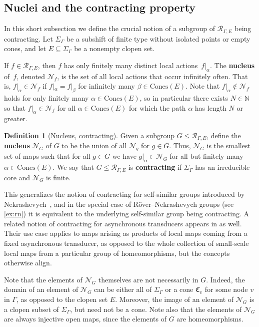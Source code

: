 \documentclass[11pt,letterpaper]{amsart}
\theoremstyle{definition}
\newtheorem{definition}[theorem]{Definition}
\newcommand{\newword}[1]{\textbf{#1}}
\newcommand{\N}{\mathbb{N}}
\newcommand{\R}{\mathcal{R}}
\newcommand{\Nuc}{\mathcal{N}}
\newcommand{\C}{\mathfrak{C}}
\newcommand{\Cones}{\mathrm{Cones}}
\begin{document}
\subsection{Nuclei and the contracting property}\label{ssec:nuclei}

In this short subsection we define the crucial notion of a subgroup of $\R_{\Gamma,E}$ being contracting. Let $\Sigma_\Gamma$ be a subshift of finite type without isolated points or empty cones, and let $E\subseteq \Sigma_\Gamma$ be a nonempty clopen set.

If $f\in \R_{\Gamma,E}$, then $f$ has only finitely many distinct local actions~$f|_\alpha$.  The \newword{nucleus} of~$f$, denoted $\Nuc_f$, is the set of all local actions that occur infinitely often. That is, $f|_{\alpha}\in \Nuc_f$ if $f|_{\alpha}=f|_{\beta}$ for infinitely many $\beta\in\Cones(E)$. 
 Note that $f|_\alpha\notin \Nuc_f$ holds for only finitely many $\alpha\in\Cones(E)$, so in particular there exists $N\in\N$ so that $f|_\alpha\in \Nuc_f$ for all $\alpha\in \Cones(E)$ for which the path $\alpha$ has length $N$ or greater.

\begin{definition}[Nucleus, contracting]\label{def:contracting}
Given a subgroup $G\le \R_{\Gamma,E}$, define the \newword{nucleus} $\Nuc_G$ of $G$ to be the union of all $\Nuc_g$ for $g\in G$. Thus, $\Nuc_G$ is the smallest set of maps such that for all $g\in G$ we have $g|_\alpha\in\Nuc_G$ for all but finitely many $\alpha\in \Cones(E)$. We say that $G\le \R_{\Gamma,E}$ is \newword{contracting} if $\Sigma_\Gamma$ has an irreducible core and $\Nuc_G$ is finite.
\end{definition}

This generalizes the notion of contracting for self-similar groups introduced by Nekrashevych~\cite{Nekrashevych-book}, and in the special case of R\"over--Nekrashevych groups (see \cref{ex:rn}) it is equivalent to the underlying self-similar group being contracting.  A related notion of contracting for asynchronous transducers appears in \cite{DonovenOlukoya} as well.  Their use case applies to maps arising as products of local maps coming from a fixed asynchronous transducer, as opposed to the whole collection of small-scale local maps from a particular group of homeomorphisms, but the concepts otherwise align.

Note that the elements of $\Nuc_G$ themselves are not necessarily in $G$. Indeed, the domain of an element of $\Nuc_G$ can be either all of $\Sigma_\Gamma$ or a cone $\C_v$ for some node $v$ in $\Gamma$, as opposed to the clopen set $E$. Moreover, the image of an element of $\Nuc_G$ is a clopen subset of $\Sigma_{\Gamma}$, but need not be a cone. Note also that the elements of $\Nuc_G$ are always injective open maps, since the elements of $G$ are homeomorphisms.
\end{document}
